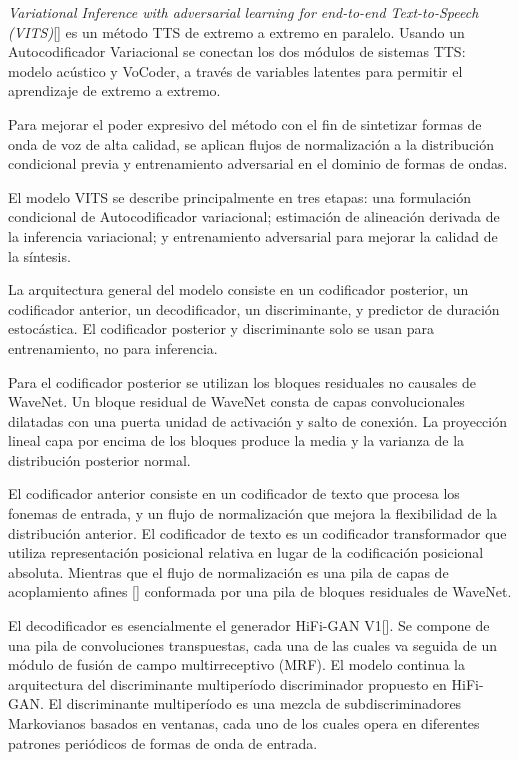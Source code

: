 \textit{Variational Inference with adversarial learning for end-to-end Text-to-Speech (VITS)}[\cite{kim2021conditional}] es un método TTS de extremo a extremo en paralelo. Usando un Autocodificador Variacional se conectan los dos módulos de sistemas TTS: modelo acústico y VoCoder, a través de variables latentes para permitir el aprendizaje de extremo a extremo. 

Para mejorar el poder expresivo del método con el fin de sintetizar formas de onda de voz de alta calidad, se aplican flujos de normalización a la distribución condicional previa y entrenamiento adversarial en el dominio de formas de ondas.

El modelo VITS se describe principalmente en tres etapas: una formulación condicional de Autocodificador variacional; estimación de alineación derivada de la inferencia variacional; y entrenamiento adversarial para mejorar la calidad de la síntesis.

La arquitectura general del modelo consiste en un codificador posterior, un codificador anterior, un decodificador, un discriminante, y predictor de duración estocástica. El codificador posterior y discriminante solo se usan para entrenamiento, no para inferencia.

Para el codificador posterior se utilizan los bloques residuales no causales de WaveNet. Un bloque residual de WaveNet consta de capas convolucionales dilatadas con una puerta unidad de activación y salto de conexión. La proyección lineal
capa por encima de los bloques produce la media y la varianza de
la distribución posterior normal.

El codificador anterior consiste en un codificador de texto que procesa los fonemas de entrada, y un flujo de normalización que mejora la flexibilidad de la distribución anterior. El codificador de texto es un codificador transformador que utiliza representación posicional relativa en lugar de la codificación posicional absoluta. Mientras que el flujo de normalización es una pila de capas de acoplamiento afines [\cite{dinh2016density}] conformada por una pila de bloques residuales de WaveNet. 

El decodificador es esencialmente el generador HiFi-GAN V1[\cite{kong2020hifi}]. Se compone de una pila de convoluciones transpuestas, cada una de las cuales va seguida de un módulo de fusión de campo multirreceptivo (MRF). El modelo continua la arquitectura del discriminante multiperíodo discriminador propuesto en HiFi-GAN. El discriminante multiperíodo es una mezcla de subdiscriminadores Markovianos basados en ventanas, cada uno de los cuales opera en diferentes patrones periódicos de formas de onda de entrada.


